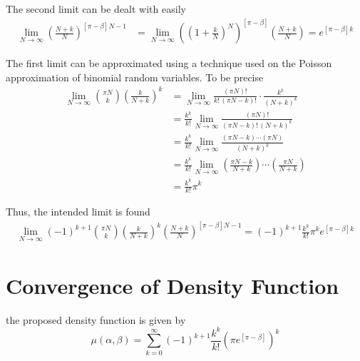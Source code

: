 \documentclass{article}
\newcommand{\ppar}[1]{\left( #1 \right)}
\newcommand{\spar}[1]{\left[ #1 \right]}
\begin{document}
The second limit can be dealt with easily
\begin{align*}
    \lim_{N \rightarrow \infty}
    \ppar{\frac{N+k}{N}}^{\spar{\pi-\beta} N -1}
    &=
    \lim_{N \rightarrow \infty}
    \ppar{\ppar{1+\frac{k}{N}}^N}^{\spar{\pi - \beta}}
    \ppar{\frac{N+k}{N}}
    =
    e^{\spar{\pi - \beta}k}
\end{align*}

The first limit can be approximated using a technique used on the Poisson approximation of binomial random variables. 
%
To be precise
\begin{align*}
    \lim_{N \rightarrow \infty}
    \binom{\pi N}{k}
    \ppar{\frac{k}{N+k}}^k
    &=
    \lim_{N \rightarrow \infty}
    \frac{\ppar{\pi N}!}{k!\, \ppar{\pi N-k}!} \cdot 
    \frac{k^k}{\ppar{N+k}^k}
    \\
    &=
    \frac{k^k}{k!}
    \lim_{N \rightarrow \infty}
    \frac{\ppar{\pi N}!}{\ppar{\pi N-k}!\, \ppar{N+k}^k}
    \\
    &=
    \frac{k^k}{k!}
    \lim_{N \rightarrow \infty}
    \frac{\ppar{\pi N-k} \cdots \ppar{\pi N} }{\ppar{N+k}^k}
    \\
    &=
    \frac{k^k}{k!}
    \lim_{N \rightarrow \infty}
    \ppar{\frac{\pi N-k}{N+k}} \cdots \ppar{\frac{\pi N}{N+k}}
    \\
    &=
    \frac{k^k}{k!}
    \pi ^k
\end{align*}

Thus, the intended limit is found
\begin{multline}
    \lim_{N \rightarrow \infty}
    (-1)^{k+1} 
    \binom{\pi N}{k}
    \ppar{\frac{k}{N+k}}^k
    \ppar{\frac{N+k}{N}}^{\spar{\pi-\beta} N -1}
    =
    (-1)^{k+1}
    \frac{k^k}{k!}
    \pi ^k
    e^{\spar{\pi - \beta}k}
\end{multline}

\section{Convergence of Density Function}
\label{ap:convergence}

the proposed density function is given by
\begin{equation}
    \mu(\alpha, \beta) =
    \sum_{k=0}^{\infty}
    (-1)^{k+1} \frac{k^k}{k!} 
    \ppar{\pi
    e^{\spar{\pi-\beta}} }^k
\end{equation}
\end{document}
